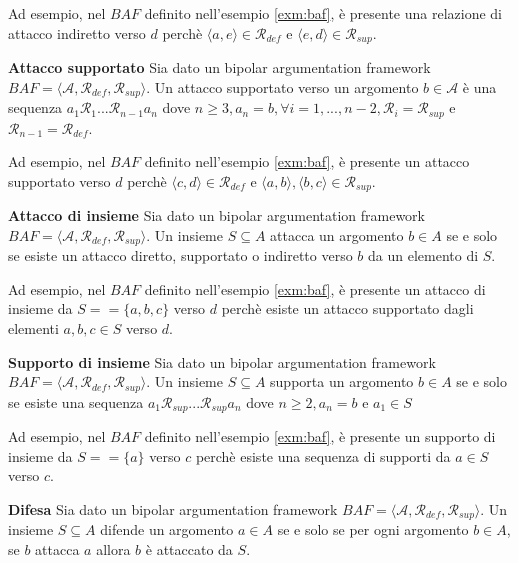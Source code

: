 Ad esempio, nel $BAF$ definito nell'esempio \ref{exm:baf}, è presente una relazione di attacco indiretto verso $d$ perchè $⟨a, e⟩ ∈ \mathcal{R}_{def}$ e $⟨e, d⟩ ∈ \mathcal{R}_{sup}$.


\bigskip
\begin{defn} \textbf{Attacco supportato} 
Sia dato un bipolar argumentation framework $BAF = ⟨\mathcal{A}, \mathcal{R}_{def}, \mathcal{R}_{sup}⟩$. Un attacco supportato verso un argomento $b ∈ \mathcal{A}$ è una sequenza $a_{1}\mathcal{R}_{1}...\mathcal{R}_{n-1}a_{n}$ dove $n \geq 3, a_n = b, \forall i = 1, ..., n-2, \mathcal{R}_i = \mathcal{R}_{sup}$ e $ \mathcal{R}_{n-1} = \mathcal{R}_{def}$.
\end{defn}

Ad esempio, nel $BAF$ definito nell'esempio \ref{exm:baf}, è presente un attacco supportato verso $d$ perchè $⟨c, d⟩ ∈ \mathcal{R}_{def}$ e $⟨a, b⟩, ⟨b, c⟩ ∈ \mathcal{R}_{sup}$.


\bigskip
\begin{defn} \textbf{Attacco di insieme} 
Sia dato un bipolar argumentation framework $BAF = ⟨\mathcal{A}, \mathcal{R}_{def}, \mathcal{R}_{sup}⟩$. Un insieme $S \subseteq A$ attacca un argomento $b \in A$ se e solo se esiste un attacco diretto, supportato o indiretto verso $b$ da un elemento di $S$.
\end{defn}

Ad esempio, nel $BAF$ definito nell'esempio \ref{exm:baf}, è presente un attacco di insieme da $S = =\{a, b, c\}$ verso $d$ perchè esiste un attacco supportato dagli elementi $a, b, c \in S$ verso $d$.


\bigskip
\begin{defn} \textbf{Supporto di insieme} 
Sia dato un bipolar argumentation framework $BAF = ⟨\mathcal{A}, \mathcal{R}_{def}, \mathcal{R}_{sup}⟩$. Un insieme $S \subseteq A$ supporta un argomento $b \in A$ se e solo se esiste una sequenza $a_{1}\mathcal{R}_{sup}...\mathcal{R}_{sup}a_{n}$ dove $n \geq 2, a_n = b$ e $a_1 \in S$
\end{defn}

Ad esempio, nel $BAF$ definito nell'esempio \ref{exm:baf}, è presente un supporto di insieme da $S = =\{a\}$ verso $c$ perchè esiste una sequenza di supporti da $a \in S$ verso $c$.


\bigskip
\begin{defn} \textbf{Difesa} 
Sia dato un bipolar argumentation framework $BAF = ⟨\mathcal{A}, \mathcal{R}_{def}, \mathcal{R}_{sup}⟩$. Un insieme $S \subseteq A$ difende un argomento $a \in A$ se e solo se per ogni argomento $b \in A$, se $b$ attacca $a$ allora $b$ è attaccato da $S$.
\end{defn}

